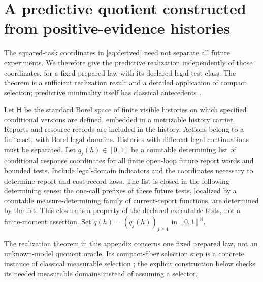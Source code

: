\section{A predictive quotient constructed from positive-evidence histories}\label{sec:quotient}
The squared-task coordinates in \eqref{eq:derived} need not separate all future experiments. We therefore give the predictive realization independently of those coordinates, for a fixed prepared law with its declared legal test class. The theorem is a sufficient realization result and a detailed application of compact selection; predictive minimality itself has classical antecedents \cite{SC,BC}.

Let $\mathsf H$ be the standard Borel space of finite visible histories on which specified conditional versions are defined, embedded in a metrizable history carrier. Reports and resource records are included in the history. Actions belong to a finite set, with Borel legal domains. Histories with different legal continuations must be separated. Let $q_j(h)\in[0,1]$ be a countable determining list of conditional response coordinates for all finite open-loop future report words and bounded tests. Include legal-domain indicators and the coordinates necessary to determine report and cost-record laws. The list is closed in the following determining sense: the one-call prefixes of these future tests, localized by a countable measure-determining family of current-report functions, are determined by the list. This closure is a property of the declared executable tests, not a finite-moment assertion. Set $q(h)=(q_j(h))_{j\ge1}$ in $[0,1]^{\mathbb N}$.

The realization theorem in this appendix concerns one fixed prepared law, not an unknown-model quotient oracle. Its compact-fiber selection step is a concrete instance of classical measurable selection \cite{KRN65}; the explicit construction below checks its needed measurable domains instead of assuming a selector.

